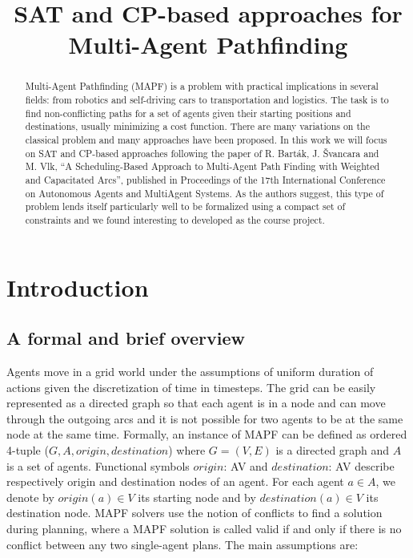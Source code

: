 \documentclass[12pt, a4paper, hidelinks]{article}
\numberwithin{equation}{section}
\begin{document}
\title{SAT and CP-based approaches for Multi-Agent Pathfinding}
\maketitle

\begin{abstract}
Multi-Agent Pathfinding (MAPF) is a problem with practical implications in several fields: from robotics and self-driving cars to transportation and logistics.
The task is to find non-conflicting paths for a set of agents given their starting positions and destinations, usually minimizing a cost function.
There are many variations on the classical problem and many approaches have been proposed.
In this work we will focus on SAT and CP-based approaches following the paper of R. Barták, J. Švancara and M. Vlk, ``A Scheduling-Based Approach to Multi-Agent Path Finding with Weighted and Capacitated Arcs'', published in Proceedings of the 17th International Conference on Autonomous Agents and MultiAgent Systems.
As the authors suggest, this type of problem lends itself particularly well to be formalized using a compact set of constraints and we found interesting to developed as the course project.
\end{abstract}

\section*{Introduction}\label{sec:introduction}
\subsection*{A formal and brief overview}
Agents move in a grid world under the assumptions of uniform duration of actions given the discretization of time in timesteps.
The grid can be easily represented as a directed graph so that each agent is in a node and can move through the outgoing arcs and it is not possible for two agents to be at the same node at the same time.
Formally, an instance of MAPF can be defined as ordered 4-tuple ($G, A, origin, destination$) where $G = (V, E)$ is a directed graph and $A$ is a set of agents.
Functional symbols $origin$: A\textrightarrow V and $destination$: A\textrightarrow V describe respectively origin and destination nodes of an agent.
For each agent $a\in A$, we denote by $origin(a)\in V$ its starting node and by $destination(a)\in V$ its destination node.
MAPF solvers use the notion of conflicts to find a solution during planning, where a MAPF solution is called valid if and only if there is no conflict between any two single-agent plans.
The main assumptions are:
\end{document}
